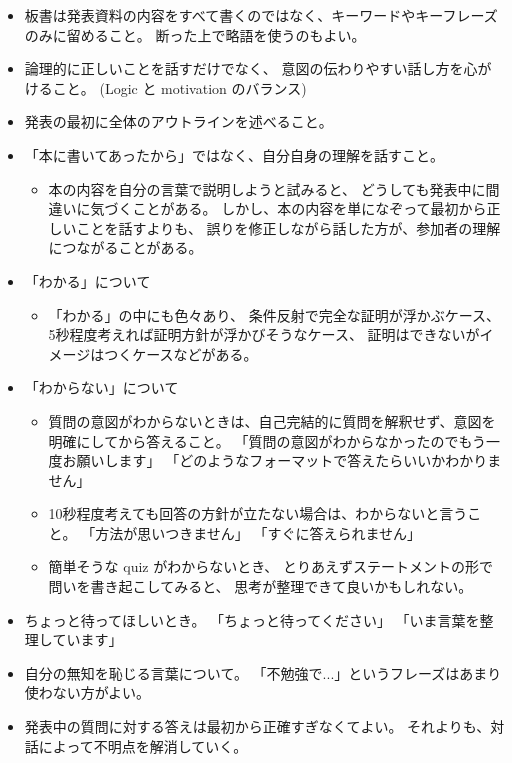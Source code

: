 \documentclass[report, notitlepage]{jlreq}
\begin{document}
\begin{itemize}
    \item 板書は発表資料の内容をすべて書くのではなく、キーワードやキーフレーズのみに留めること。
        断った上で略語を使うのもよい。
    \item 論理的に正しいことを話すだけでなく、
        意図の伝わりやすい話し方を心がけること。
        (Logic と motivation のバランス)
    \item 発表の最初に全体のアウトラインを述べること。
    \item 「本に書いてあったから」ではなく、自分自身の理解を話すこと。
        \begin{itemize}
            \item 本の内容を自分の言葉で説明しようと試みると、
                どうしても発表中に間違いに気づくことがある。
                しかし、本の内容を単になぞって最初から正しいことを話すよりも、
                誤りを修正しながら話した方が、参加者の理解につながることがある。
        \end{itemize}
    \item 「わかる」について
        \begin{itemize}
            \item 「わかる」の中にも色々あり、
                条件反射で完全な証明が浮かぶケース、
                5秒程度考えれば証明方針が浮かびそうなケース、
                証明はできないがイメージはつくケースなどがある。
        \end{itemize}
    \item 「わからない」について
        \begin{itemize}
            \item 質問の意図がわからないときは、自己完結的に質問を解釈せず、意図を明確にしてから答えること。
                「質問の意図がわからなかったのでもう一度お願いします」
                「どのようなフォーマットで答えたらいいかわかりません」
            \item 10秒程度考えても回答の方針が立たない場合は、わからないと言うこと。
                「方法が思いつきません」
                「すぐに答えられません」
            \item 簡単そうな quiz がわからないとき、
                とりあえずステートメントの形で問いを書き起こしてみると、
                思考が整理できて良いかもしれない。
        \end{itemize}
    \item ちょっと待ってほしいとき。
        「ちょっと待ってください」
        「いま言葉を整理しています」
    \item 自分の無知を恥じる言葉について。
        「不勉強で...」というフレーズはあまり使わない方がよい。
    \item 発表中の質問に対する答えは最初から正確すぎなくてよい。
        それよりも、対話によって不明点を解消していく。
\end{itemize}
\end{document}

